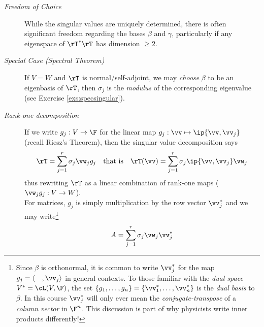 \begin{description}
  \item[\normalfont\emph{Freedom of Choice}\quad] While the singular values are uniquely determined, there is often significant freedom regarding the bases $\beta$ and $\gamma$, particularly if any eigenspace of $\rT^*\rT$ has dimension $\ge 2$.
  
  \item[\normalfont\emph{Special Case (Spectral Theorem)}\quad] If $V=W$ and $\rT$ is normal/self-adjoint, we may \emph{choose} $\beta$ to be an eigenbasis of $\rT$, then $\sigma_j$ is the \emph{modulus} of the corresponding eigenvalue (see Exercise \ref{exs:specsingular}).
  
  \item[\normalfont\emph{Rank-one decomposition}\quad] If we write $g_j:V\to\F$ for the linear map $g_j:\vv\mapsto \ip{\vv,\vv_j}$ (recall Riesz's Theorem), then the singular value decomposition says
  \[\rT=\sum_{j=1}^r \sigma_j\vw_jg_j\quad \text{that is}\quad \rT(\vv)=\sum_{j=1}^r \sigma_j\ip{\vv,\vv_j}\vw_j\]
  thus rewriting $\rT$ as a linear combination of rank-one maps ($\vw_jg_j:V\to W$).\\
  For matrices, $g_j$ is simply multiplication by the row vector $\vv_j^*$ and we may write\footnote{Since $\beta$ is orthonormal, it is common to write $\vv_j^*$ for the map $g_j=\langle\quad,\vv_j\rangle$ in general contexts. To those familiar with the \emph{dual space} $V^*=\cL(V,\F)$, the set $\{g_1,\ldots,g_n\}=\{\vv_1^*,\ldots,\vv_n^*\}$ is the \emph{dual basis} to $\beta$. In this course $\vv_j^*$ will only ever mean the \emph{conjugate-transpose} of a \emph{column vector} in $\F^n$. This discussion is part of why physicists write inner products differently!}
	\[A=\sum_{j=1}^r\sigma_j\vw_j\vv_j^*\]
\end{description}

